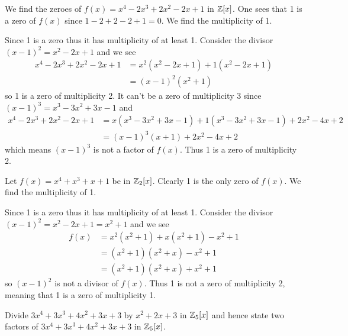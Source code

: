 \begin{example}
    We find the zeroes of $f(x) = x^4 - 2x^3 + 2x^2 - 2x + 1$ in $\mathbb{Z}[x]$. One sees that 1 is a zero of $f(x)$ since $1 - 2 + 2 - 2 + 1 = 0$. We find the multiplicity of 1.

    Since 1 is a zero thus it has multiplicity of at least 1. Consider the divisor $(x-1)^2 = x^2 - 2x + 1$ and we see
    \begin{align*}
        x^4 - 2x^3 + 2x^2 - 2x + 1 &= x^2(x^2 - 2x + 1) + 1(x^2 - 2x + 1)\\
        &= (x-1)^2(x^2+1)
    \end{align*}
    so 1 is a zero of multiplicity 2. It can't be a zero of multiplicity 3 since $(x-1)^3 = x^3 - 3x^2 + 3x - 1$ and
    \begin{align*}
        x^4 - 2x^3 + 2x^2 - 2x + 1 &= x(x^3 - 3x^2 + 3x - 1) + 1(x^3 - 3x^2 + 3x - 1) + 2x^2 - 4x + 2\\
        &= (x-1)^3(x+1) + 2x^2 - 4x + 2
    \end{align*}
    which means $(x-1)^3$ is not a factor of $f(x)$. Thus 1 is a zero of multiplicity 2.
\end{example}

\begin{example}
    Let $f(x) = x^4 + x^3 + x + 1$ be in $\mathbb{Z}_2[x]$. Clearly 1 is the only zero of $f(x)$. We find the multiplicity of 1.
    
    Since 1 is a zero thus it has multiplicity of at least 1. Consider the divisor $(x-1)^2 = x^2 - 2x + 1 = x^2 + 1$ and we see
    \begin{align*}
        f(x) &= x^2(x^2+1) + x(x^2+1) - x^2 + 1\\
        &= (x^2+1)(x^2+x) - x^2 + 1\\
        &= (x^2+1)(x^2+x) + x^2 + 1
    \end{align*}
    so $(x-1)^2$ is not a divisor of $f(x)$. Thus 1 is not a zero of multiplicity 2, meaning that 1 is a zero of multiplicity 1.
\end{example}

\begin{exercise}
    Divide $3x^4 + 3x^3 + 4x^2 + 3x + 3$ by $x^2 + 2x + 3$ in $\mathbb{Z}_5[x]$ and hence state two factors of $3x^4 + 3x^3 + 4x^2 + 3x + 3$ in $\mathbb{Z}_5[x]$.
\end{exercise}

